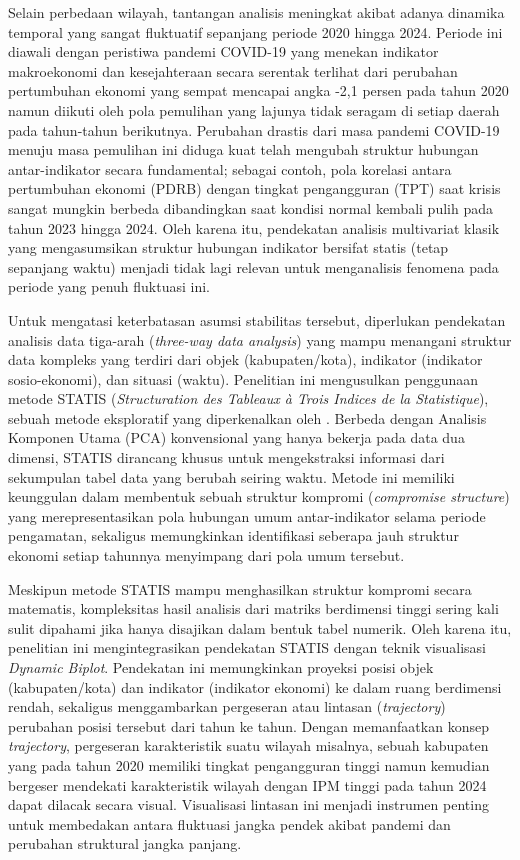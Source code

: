 Selain perbedaan wilayah, tantangan analisis meningkat akibat adanya dinamika temporal yang sangat fluktuatif sepanjang periode 2020 hingga 2024. Periode ini diawali dengan peristiwa pandemi COVID-19 yang menekan indikator makroekonomi dan kesejahteraan secara serentak terlihat dari perubahan pertumbuhan ekonomi yang sempat mencapai angka -2,1 persen pada tahun 2020 \citep{bpspdrb} namun diikuti oleh pola pemulihan yang lajunya tidak seragam di setiap daerah pada tahun-tahun berikutnya. Perubahan drastis dari masa pandemi COVID-19 menuju masa pemulihan ini diduga kuat telah mengubah struktur hubungan antar-indikator secara fundamental; sebagai contoh, pola korelasi antara pertumbuhan ekonomi (PDRB) dengan tingkat pengangguran (TPT) saat krisis sangat mungkin berbeda dibandingkan saat kondisi normal kembali pulih pada tahun 2023 hingga 2024. Oleh karena itu, pendekatan analisis multivariat klasik yang mengasumsikan struktur hubungan indikator bersifat statis (tetap sepanjang waktu) menjadi tidak lagi relevan untuk menganalisis fenomena pada periode yang penuh fluktuasi ini.

Untuk mengatasi keterbatasan asumsi stabilitas tersebut, diperlukan pendekatan analisis data tiga-arah (\textit{three-way data analysis}) yang mampu menangani struktur data kompleks yang terdiri dari objek (kabupaten/kota), indikator (indikator sosio-ekonomi), dan situasi (waktu). Penelitian ini mengusulkan penggunaan metode STATIS (\textit{Structuration des Tableaux à Trois Indices de la Statistique}), sebuah metode eksploratif yang diperkenalkan oleh \citet{lavit94,oliveira2024}. Berbeda dengan Analisis Komponen Utama (PCA) konvensional yang hanya bekerja pada data dua dimensi, STATIS dirancang khusus untuk mengekstraksi informasi dari sekumpulan tabel data yang berubah seiring waktu. Metode ini memiliki keunggulan dalam membentuk sebuah struktur kompromi (\textit{compromise structure}) yang merepresentasikan pola hubungan umum antar-indikator selama periode pengamatan, sekaligus memungkinkan identifikasi seberapa jauh struktur ekonomi setiap tahunnya menyimpang dari pola umum tersebut.

Meskipun metode STATIS mampu menghasilkan struktur kompromi secara matematis, kompleksitas hasil analisis dari matriks berdimensi tinggi sering kali sulit dipahami jika hanya disajikan dalam bentuk tabel numerik. Oleh karena itu, penelitian ini mengintegrasikan pendekatan STATIS dengan teknik visualisasi \textit{Dynamic Biplot}. Pendekatan ini memungkinkan proyeksi posisi objek (kabupaten/kota) dan indikator (indikator ekonomi) ke dalam ruang berdimensi rendah, sekaligus menggambarkan pergeseran atau lintasan (\textit{trajectory}) perubahan posisi tersebut dari tahun ke tahun. Dengan memanfaatkan konsep \textit{trajectory}, pergeseran karakteristik suatu wilayah misalnya, sebuah kabupaten yang pada tahun 2020 memiliki tingkat pengangguran tinggi namun kemudian bergeser mendekati karakteristik wilayah dengan IPM tinggi pada tahun 2024 dapat dilacak secara visual. Visualisasi lintasan ini menjadi instrumen penting untuk membedakan antara fluktuasi jangka pendek akibat pandemi dan perubahan struktural jangka panjang.


